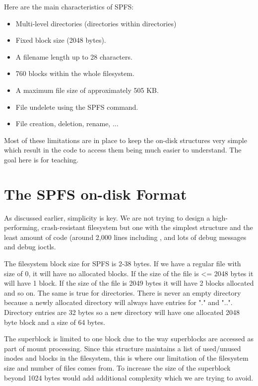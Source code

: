 Here are the main characteristics of SPFS:

\begin{itemize}
	\item Multi-level directories (directories within directories)
	\item Fixed block size (2048 bytes).
	\item A filename length up to 28 characters.
	\item 760 blocks within the whole filesystem.
	\item A maximum file size of approximately 505 KB.
	\item File undelete using the SPFS  command.
	\item File creation, deletion, rename, ... 
\end{itemize}

\noindent
Most of these limitations are in place to keep the on-disk structures very simple which result in the code to access them being much easier to understand. The goal here is for teaching.

\section{The SPFS on-disk Format}

As discussed earlier, simplicity is key. We are not trying to design a high-performing, crash-resistant filesystem but one with the simplest structure and the least amount of code (around 2,000 lines including ,  and lots of debug messages and debug ioctls.

The filesystem block size for SPFS is 2-38 bytes. If we have a regular file with size of 0, it will have no allocated blocks. If the size of the file is <= 2048 bytes it will have 1 block. If the size of the file is 2049 bytes it will have 2 blocks allocated and so on. The same is true for directories. There is never an empty directory because a newly allocated directory will always have entries for "." and "..". Directory entries are 32 bytes so a new directory will have one allocated 2048 byte block and a size of 64 bytes.

The superblock is limited to one block due to the way superblocks are accessed as part of mount processing. Since this structure maintains a list of used/unused inodes and blocks in the filesystem, this is where our limitation of the filesystem size and number of files comes from. To increase the size of the superblock beyond 1024 bytes would add additional complexity which we are trying to avoid.

